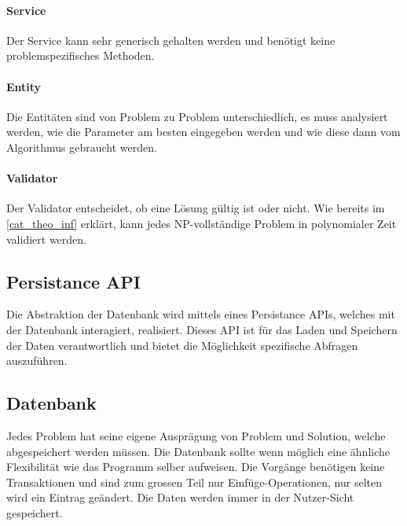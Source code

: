 \paragraph{Service}
Der Service kann sehr generisch gehalten werden und benötigt keine problemspezifisches Methoden. 
\paragraph{Entity}
Die Entitäten sind von Problem zu Problem unterschiedlich, es muss analysiert werden, wie die Parameter am besten eingegeben werden und wie diese dann vom Algorithmus 
gebraucht werden. 
\paragraph{Validator}
Der Validator entscheidet, ob eine Lösung gültig ist oder nicht. Wie bereits im \autoref{cat_theo_inf} erklärt, kann jedes NP-vollständige Problem in polynomialer Zeit validiert werden.

\subsection{Persistance API}
Die Abstraktion der Datenbank wird mittels eines Persistance APIs, welches mit der Datenbank interagiert, realisiert. Dieses API ist für das Laden und Speichern der Daten 
verantwortlich und bietet die Möglichkeit spezifische Abfragen auszuführen.

\subsection{Datenbank}
Jedes Problem hat seine eigene Ausprägung von Problem und Solution, welche abgespeichert werden müssen. Die Datenbank sollte wenn möglich eine ähnliche Flexibilität wie 
das Programm selber aufweisen. Die Vorgänge benötigen keine Transaktionen und sind zum grossen Teil nur Einfüge-Operationen, nur selten wird ein Eintrag geändert. Die Daten werden 
immer in der Nutzer-Sicht gespeichert.

